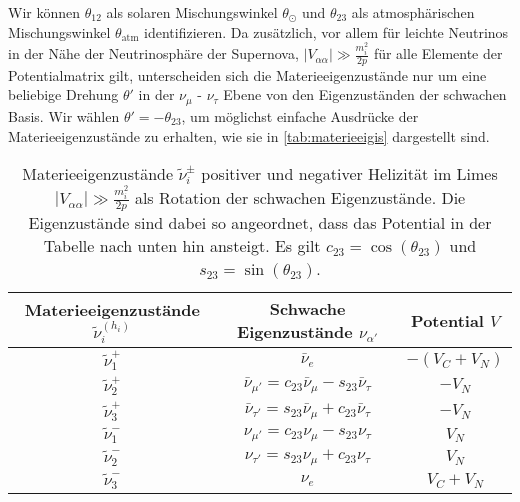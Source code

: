 Wir können $\theta_{1 2}$ als solaren Mischungswinkel $\theta_\odot$ und $\theta_{2 3}$ als atmosphärischen Mischungswinkel $\theta_\text{atm}$ identifizieren.
Da zusätzlich, vor allem für leichte Neutrinos in der Nähe der Neutrinosphäre der Supernova, $|V_{\alpha \alpha}| \gg \frac{m^2_i}{2 p}$ für alle Elemente der Potentialmatrix gilt, unterscheiden sich die Materieeigenzustände nur um eine
beliebige Drehung $\theta'$ in der $\nu_\mu$ - $\nu_\tau$ Ebene von den Eigenzuständen der schwachen Basis.
Wir wählen $\theta' = -\theta_{2 3}$, um möglichst einfache Ausdrücke der Materieeigenzustände zu erhalten, wie sie in \autoref{tab:materieeigis} dargestellt sind.
\begin{table}[H]
    \centering
    \begin{tabular}{S S S}
      \toprule
    {Materieeigenzustände $\tilde{\nu}^{(h_i)}_i$} & {Schwache Eigenzustände $\nu_{\alpha'}$} & {Potential $V$} \\
      \midrule
       {$\tilde{\nu}^+_1$} & {$\bar{\nu}_e$}                                                        &  {$- (V_C + V_N)$} \\
       {$\tilde{\nu}^+_2$} & {$\bar{\nu}_{\mu'}  = c_{2 3} \bar{\nu}_\mu - s_{2 3} \bar{\nu}_\tau$} &  {$- V_N$} \\
       {$\tilde{\nu}^+_3$} & {$\bar{\nu}_{\tau'} = s_{2 3} \bar{\nu}_\mu + c_{2 3} \bar{\nu}_\tau$} &  {$- V_N$} \\
       {$\tilde{\nu}^-_1$} & {$\nu_{\mu'}        = c_{2 3} \nu_\mu       - s_{2 3} \nu_\tau$}       &  {$V_N$} \\
       {$\tilde{\nu}^-_2$} & {$\nu_{\tau'}       = s_{2 3} \nu_\mu       + c_{2 3} \nu_\tau$}       &  {$V_N$} \\
       {$\tilde{\nu}^-_3$} & {$\nu_e$}                                                              &  {$V_C + V_N$} \\
    \bottomrule
    \end{tabular}
    \caption{Materieeigenzustände $\tilde{\nu}^\pm_i$ positiver und negativer Helizität im Limes $|V_{\alpha \alpha}| \gg \frac{m^2_i}{2 p}$ als Rotation der schwachen Eigenzustände. Die Eigenzustände sind dabei so
            angeordnet, dass das Potential in der Tabelle nach unten hin ansteigt. Es gilt $c_{2 3} = \cos(\theta_{2 3})$ und $s_{2 3} = \sin(\theta_{2 3})$.}
    \label{tab:materieeigis}
\end{table}

